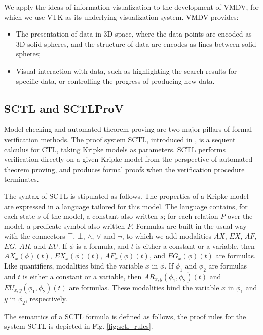 \documentclass[runningheads]{llncs}
\newcommand\tool[1]{\textsf{#1}}
\begin{document}
 
We apply the ideas of information visualization to the development of \textsf{VMDV}, for which we use \tool{VTK} as its underlying visualization system. \tool{VMDV} provides:
\begin{itemize}
       \item The presentation of data in 3D space, where the data points are encoded as 3D solid spheres, and the structure of data are encodes as lines between solid spheres;
       \item Visual interaction with data, such as highlighting the search results for specific data, or controlling the progress of producing new data.
\end{itemize}

 
\subsection{\textsf{SCTL} and \textsf{SCTLProV}}
Model checking \cite{CGP01,EmersonC82,EmersonH85} and automated theorem proving
\cite{Fitting96,Loveland78} are two major pillars of formal verification methods.
The proof system \textsf{SCTL}, introduced in \cite{dowek2013logical}, is a sequent calculus for \textsf{CTL},
taking Kripke models as parameters.
\textsf{SCTL} performs verification directly on a given Kripke model from the perspective of automated theorem proving,
and produces formal proofs when the verification procedure terminates.
 
The syntax of \textsf{SCTL} is stipulated as follows.
The properties of a Kripke model are expressed in a language tailored for this model.
The language contains,
for each state $s$ of the model, a constant also written $s$; 
for each relation $P$ over the model, a predicate symbol also written $P$.
Formulas are built in the usual way with the connectors $\top$, $\bot$, $\wedge$, $\vee$ and $\neg$, to which we add modalities $AX$, $EX$, $AF$, $EG$, $AR$, and $EU$. If $\phi$ is a formula, and $t$ is either a constant or a variable, then $AX_x(\phi)(t)$, $EX_x(\phi)(t)$, $AF_x(\phi)(t)$, and $EG_x(\phi)(t)$ are formulas. Like quantifiers, modalities bind the variable $x$ in $\phi$. If $\phi_1$ and $\phi_2$ are formulas and $t$ is either a constant or a variable, then $AR_{x,y}(\phi_1,\phi_2)(t)$ and $EU_{x,y}(\phi_1,\phi_2)(t)$ are formulas. These modalities bind the variable $x$ in $\phi_1$ and $y$ in $\phi_2$, respectively.
 
The semantics of a \textsf{SCTL} formula is defined as follows, 
the proof rules for the system \textsf{SCTL} is depicted in Fig. \ref{fig:sctl_rules}.
 
\end{document}

